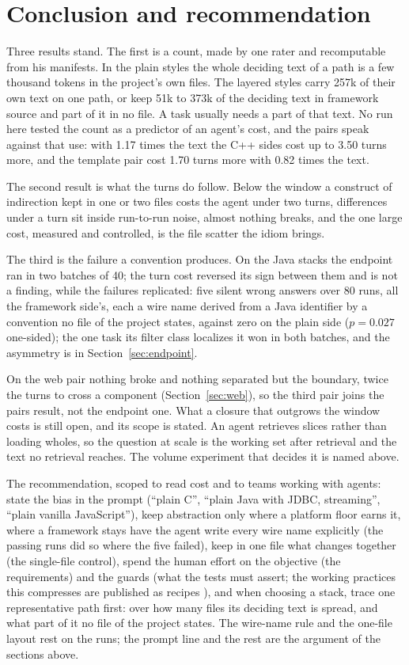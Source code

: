 \documentclass[journal]{IEEEtran}
\begin{document}
\section{Conclusion and recommendation}

Three results stand. The first is a count, made by one rater and
recomputable from his manifests. In the plain styles the whole deciding
text of a path is a few thousand tokens in the project's own files. The
layered styles carry 257k of their own text on one path, or keep 51k to
373k of the deciding text in framework source and part of it in no
file. A task usually needs a part of that text. No run here tested the
count as
a predictor of an agent's cost, and the pairs speak against that use:
with 1.17 times the text the C++ sides cost up to 3.50 turns more, and
the template pair cost 1.70 turns more with 0.82 times the text.

The second result is what the turns do follow. Below
the window a construct of indirection kept in one or two files costs the
agent under two turns, differences under a turn sit inside run-to-run
noise, almost nothing breaks, and the one large cost,
measured and controlled, is the file scatter the idiom brings.

The third is the failure a convention produces. On the
Java stacks the endpoint ran in two batches of 40; the turn cost
reversed its sign between them and is not a finding, while the
failures replicated: five silent wrong answers over 80 runs, all the
framework side's, each a wire name derived from a Java identifier by a
convention no file of the project states, against zero on the plain side
($p = 0.027$ one-sided); the one task its filter class localizes it won in both
batches, and the asymmetry is in Section~\ref{sec:endpoint}.

On the web
pair nothing broke and nothing separated but the boundary, twice the
turns to cross a component (Section~\ref{sec:web}), so the third pair
joins the pairs result, not the endpoint one. What a closure that outgrows the window costs is still open, and its scope is
stated. An agent retrieves slices rather than loading wholes,
so the question at scale is the working set after retrieval and the text
no retrieval reaches. The volume experiment that decides it is named
above.

The recommendation, scoped to read cost and to teams working with agents:
state the bias in the prompt (``plain C'', ``plain Java with JDBC,
streaming'', ``plain vanilla JavaScript''), keep abstraction only where a platform floor earns it,
where a framework stays have the agent write every wire name explicitly
(the passing runs did so where the five failed), keep in one file
what changes together (the single-file control), spend the human
effort on the objective (the requirements) and the guards (what the tests
must assert; the working practices this compresses are published as
recipes \cite{recipes}), and when choosing a stack, trace one
representative path first: over how many files its deciding text is
spread, and what part of it no file of the project states. The
wire-name rule and the one-file layout rest on the runs; the prompt
line and the rest are the argument of the sections above.
\end{document}
